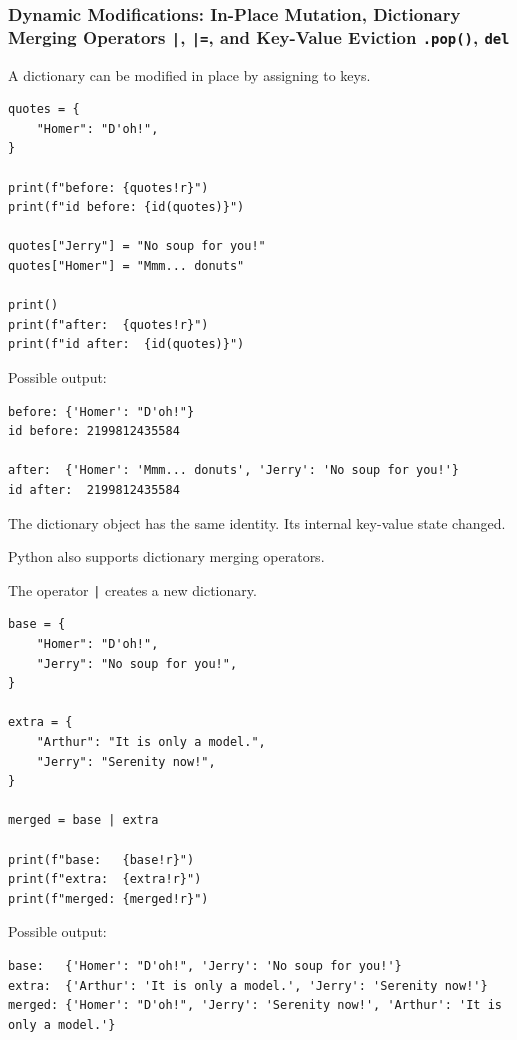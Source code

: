 \subsubsection{Dynamic Modifications: In-Place Mutation, Dictionary Merging Operators \texttt{|}, \texttt{|=}, and Key-Value Eviction \texttt{.pop()}, \texttt{del}}

A dictionary can be modified in place by assigning to keys.

\begin{verbatim}
quotes = {
    "Homer": "D'oh!",
}

print(f"before: {quotes!r}")
print(f"id before: {id(quotes)}")

quotes["Jerry"] = "No soup for you!"
quotes["Homer"] = "Mmm... donuts"

print()
print(f"after:  {quotes!r}")
print(f"id after:  {id(quotes)}")
\end{verbatim}

Possible output:

\begin{verbatim}
before: {'Homer': "D'oh!"}
id before: 2199812435584

after:  {'Homer': 'Mmm... donuts', 'Jerry': 'No soup for you!'}
id after:  2199812435584
\end{verbatim}

The dictionary object has the same identity. Its internal key-value state changed.

Python also supports dictionary merging operators.

The operator \texttt{|} creates a new dictionary.

\begin{verbatim}
base = {
    "Homer": "D'oh!",
    "Jerry": "No soup for you!",
}

extra = {
    "Arthur": "It is only a model.",
    "Jerry": "Serenity now!",
}

merged = base | extra

print(f"base:   {base!r}")
print(f"extra:  {extra!r}")
print(f"merged: {merged!r}")
\end{verbatim}

Possible output:

\begin{verbatim}
base:   {'Homer': "D'oh!", 'Jerry': 'No soup for you!'}
extra:  {'Arthur': 'It is only a model.', 'Jerry': 'Serenity now!'}
merged: {'Homer': "D'oh!", 'Jerry': 'Serenity now!', 'Arthur': 'It is only a model.'}
\end{verbatim}

